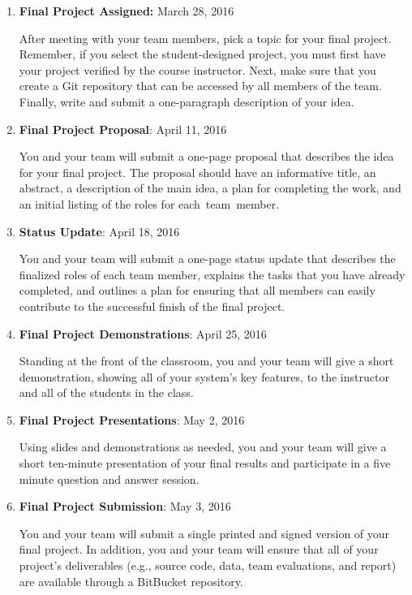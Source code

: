 \vspace*{-.05in}
\begin{enumerate}

  \itemsep0in

  \item {\bf Final Project Assigned:} March 28, 2016

    After meeting with your team members, pick a topic for your final project.  Remember, if you select the
    student-designed project, you must first have your project verified by the course instructor.  Next, make sure that
    you create a Git repository that can be accessed by all members of the team. Finally, write and submit a
    one-paragraph description of your idea.

  \item {\bf Final Project Proposal}: April 11, 2016

    You and your team will submit a one-page proposal that describes the idea for your final project.  The proposal
    should have an informative title, an abstract, a description of the main idea, a plan for completing the work, and
    an initial listing of the roles for \mbox{each team member}.

  \item {\bf Status Update}: April 18, 2016

    You and your team will submit a one-page status update that describes the finalized roles of each team member,
    explains the tasks that you have already completed, and outlines a plan for ensuring that all members can easily
    contribute to the successful finish of the final project.

  \item {\bf Final Project Demonstrations}: April 25, 2016

    Standing at the front of the classroom, you and your team will give a short demonstration, showing all of your
    system's key features, to the instructor and all of the students in the class.

  \item {\bf Final Project Presentations}: May 2, 2016

    Using slides and demonstrations as needed, you and your team will give a short ten-minute presentation of your final
    results and participate in a five minute question and answer session.

  \item {\bf Final Project Submission}: May 3, 2016

    You and your team will submit a single printed and signed version of your final project. In addition, you and your
    team will ensure that all of your project's deliverables (e.g., source code, data, team evaluations, and report) are
    available through a BitBucket repository.

\end{enumerate}

